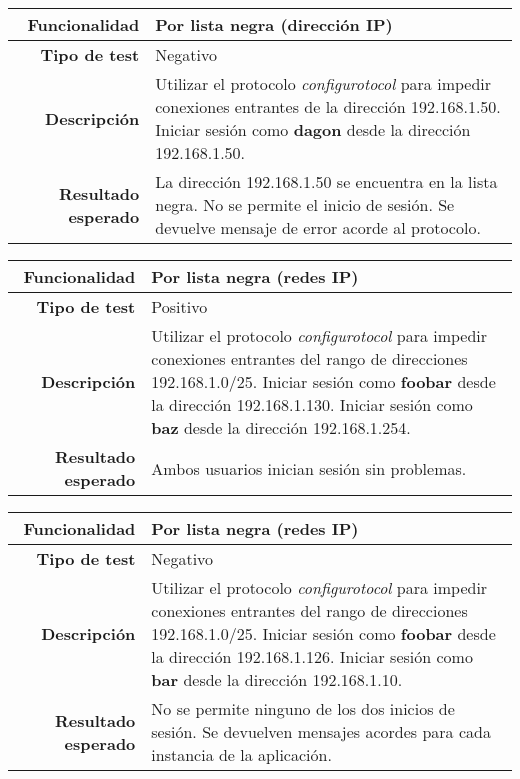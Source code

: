 \documentclass[a4paper,10pt]{article}
\begin{document}
\begin{center}
  \begin{tabular}{|r|p{12.5cm}|}
    \hline
    \textbf{Funcionalidad}	&	Por lista negra (dirección IP)\\
    \hline
    \textbf{Tipo de test}	&	Negativo\\
    \hline
    \textbf{Descripción}	&	Utilizar el protocolo \textit{configurotocol} para impedir conexiones
					entrantes de la dirección 192.168.1.50. Iniciar sesión como
					\textbf{dagon} desde la dirección 192.168.1.50.\\
    \hline
    \textbf{Resultado esperado}	&	La dirección 192.168.1.50 se encuentra en la lista negra. No se permite
					el inicio de sesión. Se devuelve mensaje de error acorde al protocolo.\\
    \hline   
  \end{tabular}
\end{center}

\begin{center}
  \begin{tabular}{|r|p{12.5cm}|}
    \hline
    \textbf{Funcionalidad}	&	Por lista negra (redes IP)\\
    \hline
    \textbf{Tipo de test}	&	Positivo\\
    \hline
    \textbf{Descripción}	&	Utilizar el protocolo \textit{configurotocol} para impedir conexiones
					entrantes del rango de direcciones 192.168.1.0/25. Iniciar sesión como
					\textbf{foobar} desde la dirección 192.168.1.130. Iniciar sesión como
					\textbf{baz} desde la dirección 192.168.1.254.\\
    \hline
    \textbf{Resultado esperado}	&	Ambos usuarios inician sesión sin problemas.\\
    \hline   
  \end{tabular}
\end{center}

\begin{center}
  \begin{tabular}{|r|p{12.5cm}|}
    \hline
    \textbf{Funcionalidad}	&	Por lista negra (redes IP)\\
    \hline
    \textbf{Tipo de test}	&	Negativo\\
    \hline
    \textbf{Descripción}	&	Utilizar el protocolo \textit{configurotocol} para impedir conexiones
					entrantes del rango de direcciones 192.168.1.0/25. Iniciar sesión como
					\textbf{foobar} desde la dirección 192.168.1.126. Iniciar sesión como
					\textbf{bar} desde la dirección 192.168.1.10.\\
    \hline
    \textbf{Resultado esperado}	&	No se permite ninguno de los dos inicios de sesión. Se devuelven mensajes
					acordes para cada instancia de la aplicación.\\
    \hline   
  \end{tabular}
\end{center}
\end{document}
